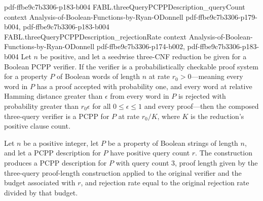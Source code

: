 \begin{theorem}
{    pdf-ffbe9c7b3306-p183-b004}
\proofstep
  {FABL.threeQueryPCPPDescription_queryCount}
  {context}
  {Analysis-of-Boolean-Functions-by-Ryan-ODonnell}
  {pdf-ffbe9c7b3306-p179-b004,
    pdf-ffbe9c7b3306-p183-b004}
\proofstep
  {FABL.threeQueryPCPPDescription_rejectionRate}
  {context}
  {Analysis-of-Boolean-Functions-by-Ryan-ODonnell}
  {pdf-ffbe9c7b3306-p174-b002,
    pdf-ffbe9c7b3306-p183-b004}
Let $n$ be positive, and let a seedwise three-CNF reduction be given for a Boolean PCPP
verifier. If the verifier is a probabilistically checkable proof system for a property
$P$ of Boolean words of length $n$ at rate $r_0>0$—meaning every word in $P$ has a proof
accepted with probability one, and every word at relative Hamming distance greater than
$\epsilon$ from every word in $P$ is rejected with probability greater than
$r_0\epsilon$ for all $0\leq\epsilon\leq1$ and every proof—then the composed three-query
verifier is a PCPP for $P$ at rate $r_0/K$, where $K$ is the reduction's positive clause
count.
\end{theorem}

\begin{definition}
\label{FABL.threeQueryPCPPDescription}
\leanok
{}
Let $n$ be a positive integer, let $P$ be a property of Boolean strings of length $n$,
and let a PCPP description for $P$ have positive query count $r$. The construction
produces a PCPP description for $P$ with query count $3$, proof length given by the
three-query proof-length construction applied to the original verifier and the budget
associated with $r$, and rejection rate equal to the original rejection rate divided by
that budget.
\end{definition}

